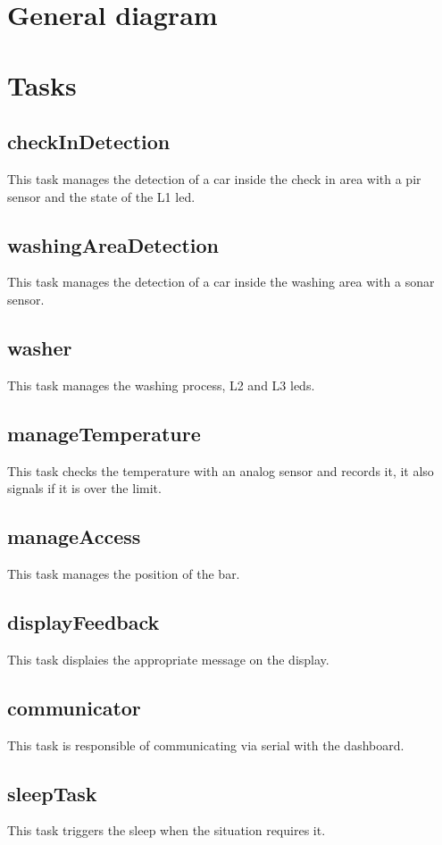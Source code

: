 \pagebreak
\section{General diagram}
\begin{figure}[H]
    \centering
\end{figure}
\pagebreak
\section{Tasks}
\subsection{checkInDetection}
This task manages the detection of a car inside the check in area with a pir sensor and the state of the L1 led.
\begin{figure}[H]
    \centering
\end{figure}
\subsection{washingAreaDetection}
This task manages the detection of a car inside the washing area with a sonar sensor.
\begin{figure}[H]
    \centering
\end{figure}
\subsection{washer}
This task manages the washing process, L2 and L3 leds.
\begin{figure}[H]
    \centering
\end{figure}
\subsection{manageTemperature}
This task checks the temperature with an analog sensor and records it, it also signals if it is over the limit.
\begin{figure}[H]
    \centering
\end{figure}
\subsection{manageAccess}
This task manages the position of the bar.
\begin{figure}[H]
    \centering
\end{figure}
\subsection{displayFeedback}
This task displaies the appropriate message on the display.
\subsection{communicator}
This task is responsible of communicating via serial with the dashboard.
\subsection{sleepTask}
This task triggers the sleep when the situation requires it.

